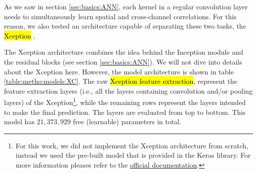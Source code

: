 

\graphicspath{{./Sections/Methodology/Resources/}}


As we saw in section \ref{sec:basics:ANN}, each kernel in a regular convolution layer needs to simultaneously learn spatial and cross-channel correlations. For this reason, we also tested an architecture capable of separating these two tasks, the \hl{Xception} \cite{chollet2017xception}.

The Xception architecture combines the idea behind the Inception module and the residual blocks (see section \ref{sec:basics:ANN}).
We will not dive into details about the Xception here. However, the model architecture is shown in table \ref{table:metho:models:XC}.
The raw \hl{Xception feature extraction}, represent the feature extraction layers (i.e., all the layers containing convolution and/or pooling layers) of the Xception\footnote{For this work, we did not implement the Xception architecture from scratch, instead we used the pre-built model that is provided in the Keras library. For more information pleases refer to the \href{https://www.tensorflow.org/api_docs/python/tf/keras/applications/xception}{official documentation}.}, while the remaining rows represent the layers intended to make the final prediction. The layers are evaluated from top to bottom. This model has $21,373,929$ free (learnable) parameters in total.

\setlength{\mylinewidth}{\linewidth-7pt}%
\setlength{\mylengtha}{0.35\mylinewidth-2\arraycolsep}%
\setlength{\mylengthb}{0.25\mylinewidth-2\arraycolsep}%
\setlength{\mylengthc}{0.18\mylinewidth-2\arraycolsep}%

